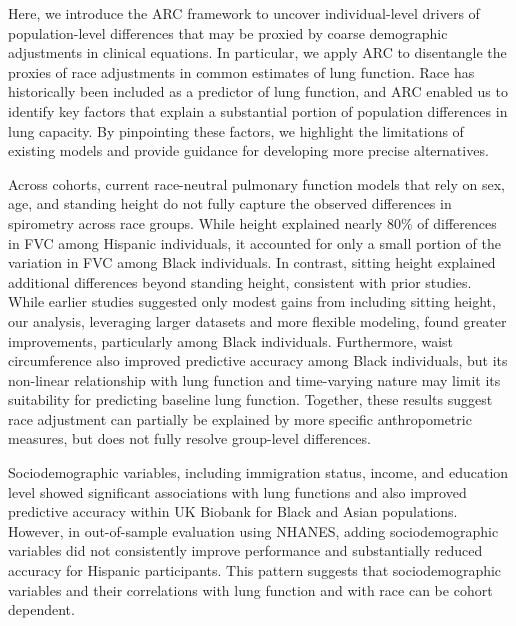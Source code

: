 \documentclass[10pt]{extarticle}
\begin{document}
Here, we introduce the ARC framework to uncover individual-level drivers of population-level differences that may be proxied by coarse demographic adjustments in clinical equations. In particular, we apply ARC to disentangle the proxies of race adjustments in common estimates of lung function. Race has historically been included as a predictor of lung function, and ARC enabled us to identify key factors that explain a substantial portion of population differences in lung capacity\cite{Hankinson1999-qt,Quanjer2012-qw}. By pinpointing these factors, we highlight the limitations of existing models and provide guidance for developing more precise alternatives.

Across cohorts, current race-neutral pulmonary function models that rely on sex, age, and standing height do not fully capture the observed differences in spirometry across race groups. While height explained nearly 80\% of differences in FVC among Hispanic individuals, it accounted for only a small portion of the variation in FVC among Black individuals. In contrast, sitting height explained additional differences beyond standing height, consistent with prior studies\cite{Bowerman2023-ff}. While earlier studies suggested only modest gains from including sitting height, our analysis, leveraging larger datasets and more flexible modeling, found greater improvements, particularly among Black individuals\cite{Bowerman2023-ff}. Furthermore, waist circumference also improved predictive accuracy among Black individuals, but its non-linear relationship with lung function and time-varying nature may limit its suitability for predicting baseline lung function\cite{Rowe2017-xy,Soundariya2013-hj}. Together, these results suggest race adjustment can partially be explained by more specific anthropometric measures, but does not fully resolve group-level differences.

Sociodemographic variables, including immigration status, income, and education level showed significant associations with lung functions and also improved predictive accuracy within UK Biobank for Black and Asian populations. However, in out-of-sample evaluation using NHANES, adding sociodemographic variables did not consistently improve performance and substantially reduced accuracy for Hispanic participants. This pattern suggests that sociodemographic variables and their correlations with lung function and with race can be cohort dependent.
\end{document}
